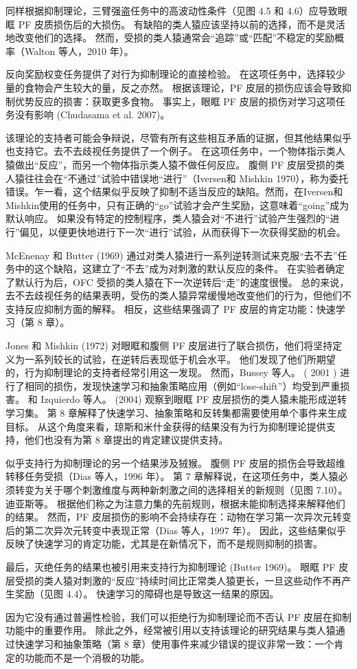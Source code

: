 \par 
同样根据抑制理论，三臂强盗任务中的高波动性条件（见图 4.5 和 4.6）应导致眼眶 PF 皮质损伤后的大损伤。 有缺陷的类人猿应该坚持以前的选择，而不是灵活地改变他们的选择。 然而，受损的类人猿通常会“追踪”或“匹配”不稳定的奖励概率（Walton 等人，2010 年）。
\par 
反向奖励权变任务提供了对行为抑制理论的直接检验。 在这项任务中，选择较少量的食物会产生较大的量，反之亦然。 根据该理论，PF 皮层的损伤应该会导致抑制优势反应的损害：获取更多食物。 事实上，眼眶 PF 皮层的损伤对学习这项任务没有影响 (Chudasama et al. 2007)。
\par 
该理论的支持者可能会争辩说，尽管有所有这些相互矛盾的证据，但其他结果似乎也支持它。去不去歧视任务提供了一个例子。 在这项任务中，一个物体指示类人猿做出“反应”，而另一个物体指示类人猿不做任何反应。 腹侧 PF 皮层受损的类人猿往往会在“不通过”试验中错误地“进行”（Iversen和 Mishkin 1970），称为委托错误。乍一看，这个结果似乎反映了抑制不适当反应的缺陷。然而，在Iversen和Mishkin使用的任务中，只有正确的“go”试验才会产生奖励，这意味着“going”成为默认响应。 如果没有特定的控制程序，类人猿会对“不进行”试验产生强烈的“进行”偏见，以便更快地进行下一次“进行”试验，从而获得下一次获得奖励的机会。
\par 
McEnenay 和 Butter (1969) 通过对类人猿进行一系列逆转测试来克服“去不去”任务中的这个缺陷，这建立了“不去”成为对刺激的默认反应的条件。 在实验者确定了默认行为后，OFC 受损的类人猿在下一次逆转后“走”的速度很慢。 总的来说，去不去歧视任务的结果表明，受伤的类人猿异常缓慢地改变他们的行为，但他们不支持反应抑制方面的解释。 相反，这些结果强调了 PF 皮层的肯定功能：快速学习（第 8 章）。
\par 
Jones 和 Mishkin (1972) 对眼眶和腹侧 PF 皮层进行了联合损伤，他们将坚持定义为一系列较长的试验，在逆转后表现低于机会水平。 他们发现了他们所期望的，行为抑制理论的支持者经常引用这一发现。 然而，Bussey 等人。 ( 2001 ) 进行了相同的损伤，发现快速学习和抽象策略应用（例如“lose-shift”）均受到严重损害。 和 Izquierdo 等人。 (2004) 观察到眼眶 PF 皮层损伤的类人猿未能形成逆转学习集。 第 8 章解释了快速学习、抽象策略和反转集都需要使用单个事件来生成目标。 从这个角度来看，琼斯和米什金获得的结果没有为行为抑制理论提供支持，他们也没有为第 8 章提出的肯定建议提供支持。
\par 
似乎支持行为抑制理论的另一个结果涉及狨猴。 腹侧 PF 皮层的损伤会导致超维转移任务受损（Dias 等人，1996 年）。 第 7 章解释说，在这项任务中，类人猿必须转变为关于哪个刺激维度与两种新刺激之间的选择相关的新规则（见图 7.10）。 迪亚斯等。 根据他们称之为注意力集的先前规则，根据未能抑制选择来解释他们的结果。 然而，PF 皮层损伤的影响不会持续存在：动物在学习第一次异次元转变后的第二次异次元转变中表现正常（Dias 等人，1997 年）。 因此，这些结果似乎反映了快速学习的肯定功能，尤其是在新情况下，而不是规则抑制的损害。
\par 
最后，灭绝任务的结果也被引用来支持行为抑制理论 (Butter 1969)。 眼眶 PF 皮层受损的类人猿对刺激的“反应”持续时间比正常类人猿更长，一旦这些动作不再产生奖励（见图 4.4）。 快速学习的障碍也是导致这一结果的原因。
\par 
因为它没有通过普遍性检验，我们可以拒绝行为抑制理论而不否认 PF 皮层在抑制功能中的重要作用。 除此之外，经常被引用以支持该理论的研究结果与类人猿通过快速学习和抽象策略（第 8 章）使用事件来减少错误的提议非常一致：一个肯定的功能而不是一个消极的功能。

